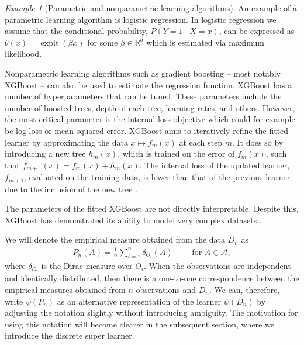 \documentclass[11pt, a4paper]{article}
\theoremstyle{definition}
\theoremstyle{remark}
\newtheorem{example}{Example}
\newcommand{\btheta}{\theta}
\newcommand{\la}{\psi}
\DeclareMathOperator{\expit}{expit}
\begin{document}
\begin{example}[Parametric and nonparametric learning algorithms]
    An example of a parametric learning algorithm is logistic regression. In logistic regression we assume that the conditional probability, $ P(Y = 1 \mid X = x) $, can be expressed as $ \btheta(x) = \expit( \beta x) $ for some $ \beta \in \mathbb{R}^{d} $ which is estimated via maximum likelihood.   

Nonparametric learning algorithms such as gradient boosting -- most notably XGBoost -- can also be used to estimate the regression function. XGBoost has a number of hyperparameters that can be tuned. These parameters include the number of boosted trees, depth of each tree, learning rates, and others. However, the most critical parameter is the internal loss objective which could for example be log-loss or mean squared error. XGBoost aims to iteratively refine the fitted learner by approximating the data $x \mapsto f_m(x)$ at each step $m$. It does so by introducing a new tree $h_m(x)$, which is trained on the error of $ f_m(x)$, such that $f_{m + 1}(x) = f_m(x) + h_m(x)$. The internal loss of the updated learner, $f_{m + 1}$, evaluated on the training data, is lower than that of the previous learner due to the inclusion of the new tree \parencite{chen2016xgboost}.

The parameters of the fitted XGBoost are not directly interpretable. Despite this, XGBoost has demonstrated its ability to model very complex datasets \parencite{chen2016xgboost}.

\end{example}
We will denote the empirical measure obtained from the data $ D_n $ as
\begin{align*}
    P_n(A) = \frac{1}{n} \sum_{i = 1}^{n} \delta_{O_i}(A)\qquad \text{ for } A \in \mathcal{A},
\end{align*}
where $ \delta_{O_i} $ is the Dirac measure over $ O_i $. When the observations are independent and identically distributed, then there is a one-to-one correspondence between the empirical measures obtained from $ n $ observations and $ D_n $. We can, therefore, write $ \la(P_n)$ as an alternative representation of the learner $\la(D_n)$ by adjusting the notation slightly without introducing ambiguity. The motivation for using this notation will become clearer in the subsequent section, where we introduce the discrete super learner.
\end{document}
